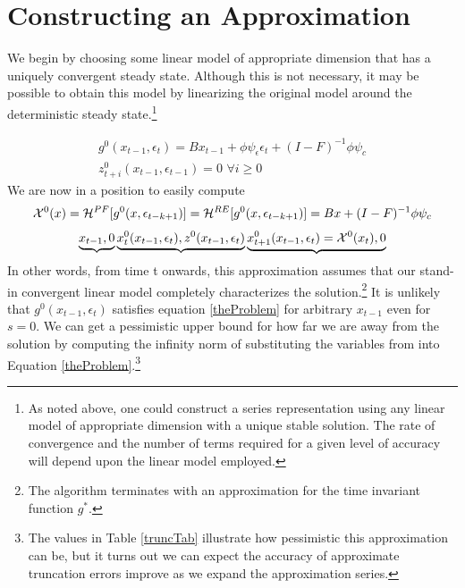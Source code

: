 \documentclass[12pt]{article}
\begin{document}
\section{Constructing an Approximation}
\label{sec:constr-an-appr}

We begin by choosing some linear model of appropriate dimension that 
has a uniquely convergent steady state.  
Although this is not necessary, it may be possible to obtain this model by
linearizing the original model around the deterministic steady state.\footnote{As noted above, one could construct a series representation using any linear
 model of appropriate dimension with a unique stable solution.  The rate of convergence and the number of terms required for a  given level of accuracy will depend upon the linear model employed.}


 \begin{gather}
 g^0(x_{t-1},\epsilon_{t})=  
B x_{t-1}+ \phi \psi_\epsilon\epsilon_{t} +
 (I - F)^{-1} \phi \psi_c\\ \label{firstIter}
z^{0}_{t+i}(x_{t-1},\epsilon_{t-1})=0 \,\, \forall i \ge 0
 \end{gather}
We are now in a position to easily compute 
 \begin{gather}
\mathcal{X}^{0}(x)=\mathcal{H}^{PF}[g^{0}(x,\epsilon_{t-k+1})]=
\mathcal{H}^{RE}[g^{0}(x,\epsilon_{t-k+1})]= 
B x+  (I - F)^{-1} \phi \psi_c
 \end{gather}
\begin{gather*}
\underbrace{x_{t-1},0} 
\underbrace{x^{0}_t(x_{t-1},\epsilon_t),z^{0}(x_{t-1},\epsilon_t)}
\underbrace{x^{0}_{t+1}(x_{t-1},\epsilon_t)=\mathcal{X}^{0}(x_{t}),0}
\end{gather*}
In other words, from time t onwards, this approximation assumes 
that our stand-in
 convergent linear model completely characterizes the solution.\footnote{
The algorithm terminates with an approximation for 
the time invariant function $g^\ast$.}  It is unlikely that $g^0(x_{t-1},\epsilon_{t})$
satisfies equation \ref{theProblem} for arbitrary $x_{t-1}$ even for $s=0$.
We can get a pessimistic upper bound for how far we are away from the solution 
by computing the infinity norm of substituting the variables from into Equation \ref{theProblem}.\footnote{The values in Table \ref{truncTab} illustrate how
pessimistic this approximation can be, but it turns out we can expect the accuracy of  approximate truncation errors improve as we expand the approximation series.}
\end{document}
